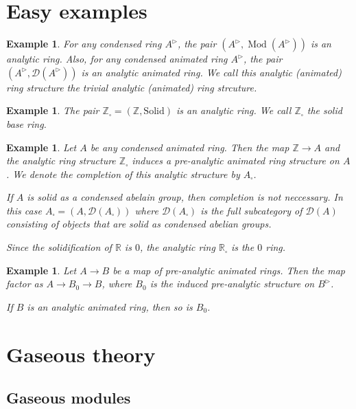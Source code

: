 \documentclass{article}
\theoremstyle{plain}
\newtheorem{exmp}[thm]{Example}
\theoremstyle{definition}
\theoremstyle{remark}
\DeclareMathOperator{\modcat}{Mod}
\newcommand{\huflag}{\triangleright}
\newcommand{\D}{\mathcal{D}}
\newcommand{\solid}{\square}
\begin{document}
\section{Easy examples}

\begin{exmp}
For any condensed ring $ A ^{\huflag} $, the pair $ (A ^{\huflag}, \modcat (A ^{\huflag})) $ is an analytic ring.
Also, for any condensed animated ring $ A ^{\huflag} $, the pair $ (A ^{\huflag}, \D (A ^{\huflag})) $ is an analytic animated ring.
We call this analytic (animated) ring structure the \emph{trivial} analytic (animated) ring strcuture.
\end{exmp}

\begin{exmp}
The pair $ \mathbb{Z}_{\solid} = (\mathbb{Z}, \mathrm{Solid}) $ is an analytic ring.
We call $ \mathbb{Z}_{\solid} $ the solid base ring.
\end{exmp}

\begin{exmp}
Let $ A $ be any condensed animated ring. Then the map $ \mathbb{Z}\to A $ and the analytic ring structure
$ \mathbb{Z}_{\solid} $ induces a pre-analytic animated ring structure on $ A $.
We denote the completion of this analytic structure by $ A _{\solid} $.

If $ A $ is solid as a condensed abelain group, then completion is not neccessary.
In this case $ A _{\solid} = (A, \D (A _{\solid})) $ where $ \D (A _{\solid}) $ is the full subcategory
of $ \D (A) $ consisting of objects that are solid as condensed abelian groups.

Since the solidification of $ \mathbb{R} $ is $ 0 $, the analytic ring $ \mathbb{R}_{\solid} $ is the $ 0 $ ring.
\end{exmp}

\begin{exmp}
Let $ A\to B $ be a map of pre-analytic animated rings.
Then the map factor as $ A \to B _{0}\to B $, where $ B _{0}$ is the induced pre-analytic
structure on $ B ^{\huflag} $.

If $ B $ is an analytic animated ring, then so is $ B _{0} $.
\end{exmp}

\section{Gaseous theory}

\subsection{Gaseous modules}
\end{document}
